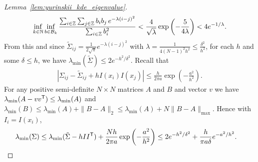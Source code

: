 \begin{proof}[Lemma~\ref{lem:yurinskii_kde_eigenvalue}]
  \begin{align*}
    \inf_{k \in \mathbb{N}}
    \inf_{b \in \mathcal{B}_k}
    \frac{\sum_{i \in \mathbb{Z}} \sum_{j \in \mathbb{Z}} b_i b_j \, e^{-\lambda(i-j)^2}}
    {\sum_{i \in \mathbb{Z}} b_i^2}
    < \frac{4}{\sqrt \lambda}
    \exp \left( - \frac{5}{4 \lambda} \right)
    < 4 e^{-1/\lambda}.
  \end{align*}
  From this and since
  $\tilde\Sigma_{i j} = \frac{1}{2 \sqrt \pi} e^{-\lambda(i-j)^2}$
  with $\lambda = \frac{1}{4(N-1)^2 h^2} \leq \frac{\delta^2}{h^2}$,
  for each $h$ and some $\delta \leq h$,
  we have $\lambda_{\min}(\tilde\Sigma) \leq 2 e^{-h^2/\delta^2}$.
  Recall that
  \begin{align*}
    \left|
    \Sigma_{i j}
    - \tilde\Sigma_{i j}
    + h I(x_i) I(x_j)
    \right|
    \leq
    \frac{h}{2 \pi a}
    \exp \left(- \frac{a^2}{h^2}\right).
  \end{align*}
  For any positive semi-definite $N \times N$ matrices $A$ and $B$
  and vector $v$ we have $\lambda_{\min}(A - v v^{\mathsf{T}}) \leq \lambda_{\min}(A)$
  and $\lambda_{\min}(B) \leq \lambda_{\min}(A) + \|B-A\|_2
  \leq \lambda_{\min}(A) + N \|B-A\|_{\max}$.
  Hence with $I_i = I(x_i)$,
  \begin{align*}
    \lambda_{\min}(\Sigma)
    &\leq
    \lambda_{\min}(\tilde\Sigma - h I I^{\mathsf{T}})
    + \frac{N h}{2 \pi a}
    \exp \left(- \frac{a^2}{h^2}\right)
    \leq
    2 e^{-h^2/\delta^2}
    + \frac{h}{\pi a \delta}
    e^{-a^2 / h^2}.
  \end{align*}
\end{proof}

